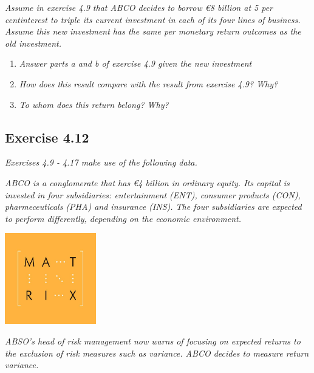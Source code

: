 \documentclass[]{book}
\newcommand{\euro}{€}
\theoremstyle{definition}
\theoremstyle{definition}
\theoremstyle{remark}
\begin{document}
\emph{Assume in exercise 4.9 that ABCO decides to borrow \euro{}8
billion at 5 per centinterest to triple its current investment in each
of its four lines of business. Assume this new investment has the same
per monetary return outcomes as the old investment.} \citep[p.118]{book}

\begin{enumerate}
\def\labelenumi{\alph{enumi}.}
\item
  \emph{Answer parts a and b of exercise 4.9 given the new investment}
  \citep[p.118]{book}
\item
  \emph{How does this result compare with the result from exercise 4.9?
  Why?} \citep[p.118]{book}
\item
  \emph{To whom does this return belong? Why?} \citep[p.118]{book}
\end{enumerate}

\subsection{Exercise 4.12}\label{exercise-4.12}

\emph{Exercises 4.9 - 4.17 make use of the following data.}
\citep[p.117]{book}

\emph{ABCO is a conglomerate that has \euro{}4 billion in ordinary
equity. Its capital is invested in four subsidiaries: entertainment
(ENT), consumer products (CON), pharmeceuticals (PHA) and insurance
(INS). The four subsidiaries are expected to perform differently,
depending on the economic environment.} \citep[p.117]{book}

\begin{center}\includegraphics[width=150px]{figures/matrix} \end{center}

\emph{ABSO's head of risk management now warns of focusing on expected
returns to the exclusion of risk measures such as variance. ABCO decides
to measure return variance.} \citep[p.118]{book}
\end{document}
